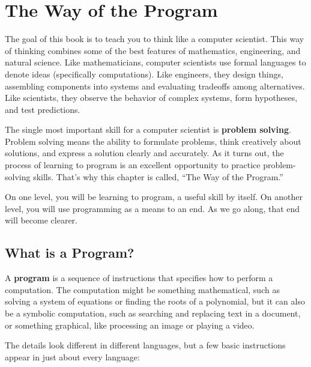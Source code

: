 \chapter{The Way of the Program}

The goal of this book is to teach you to think like a computer
scientist.  This way of thinking combines some of the best features of
mathematics, engineering, and natural science.  Like mathematicians,
computer scientists use formal languages to denote ideas (specifically
computations).  Like engineers, they design things, assembling
components into systems and evaluating tradeoffs among alternatives.
Like scientists, they observe the behavior of complex systems, form
hypotheses, and test predictions.  

The single most important skill for a computer scientist is {\bf
problem solving}.  Problem solving means the ability to formulate
problems, think creatively about solutions, and express a solution
clearly and accurately.  As it turns out, the process of learning to
program is an excellent opportunity to practice problem-solving
skills.  That's why this chapter is called, ``The Way of the
Program.''

On one level, you will be learning to program, a useful skill by
itself.  On another level, you will use programming as a means to an
end.  As we go along, that end will become clearer.


\section{What is a Program?}

A {\bf program} is a sequence of instructions that specifies how to
perform a computation.  The computation might be something
mathematical, such as solving a system of equations or finding the
roots of a polynomial, but it can also be a symbolic computation, such
as searching and replacing text in a document, or something
graphical, like processing an image or playing a video.

The details look different in different languages, but a few basic
instructions appear in just about every language:

